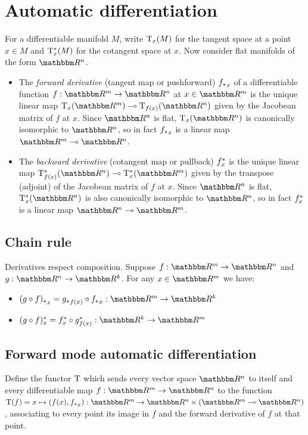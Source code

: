 \section{Automatic differentiation}
\label{sec:auto-diff}

For a differentiable manifold $M$, write $\mathrm{T}_x(M)$ for the tangent space at a point $x \in M$ and
$\mathrm{T}^*_x(M)$ for the cotangent space at $x$. Now consider flat manifolds of the form $\RR^n$.

\begin{itemize}
\item The \emph{forward derivative} (tangent map or pushforward) ${f_{*}}_x$ of a differentiable function
$f: \RR^m \to \RR^n$ at $x \in \RR^m$ is the unique linear map $\tangents_x(\RR^m) \linearto
\tangents_{f(x)}(\RR^n)$ given by the Jacobean matrix of $f$ at $x$. Since $\RR^n$ is flat,
$\tangents_x(\RR^n)$ is canonically isomorphic to $\RR^n$, so in fact ${f_{*}}_x$ is a linear map $\RR^m
\linearto \RR^n$.
\item The \emph{backward derivative} (cotangent map or pullback) $f^{*}_x$ is the unique linear map
$\cotangents_{f(x)}(\RR^n) \linearto \cotangents_x(\RR^m)$ given by the transpose (adjoint) of the Jacobean
matrix of $f$ at $x$. Since $\RR^n$ is flat, $\cotangents_x(\RR^n)$ is also canonically isomorphic to $\RR^n$,
so in fact $f^{*}_x$ is a linear map $\RR^n \linearto \RR^m$.
\end{itemize}

\subsection{Chain rule}

Derivatives respect composition. Suppose $f: \RR^m \to \RR^n$ and $g: \RR^n \to \RR^k$. For any $x \in \RR^m$
we have:

\begin{itemize}
\item $\pushf{(g \comp f)}_x = \pushf{g}_{f(x)} \comp \pushf{f}_x: \RR^m \to \RR^k$
\item $\pullf{(g \comp f)}_x = \pullf{f}_{x} \comp \pullf{g}_{f(x)}: \RR^k \to \RR^m$
\end{itemize}

\subsection{Forward mode automatic differentiation}

\begin{definition}
Define the functor $\mathrm{T}$ which sends every vector space $\RR^n$ to itself and every differentiable map
$f: \RR^m \to \RR^n$ to the function $\tangents(f) = x \mapsto (f(x), \pushf{f}_x): \RR^m \to \RR^n \times
(\RR^m \linearto \RR^n)$, associating to every point its image in $f$ and the forward derivative of $f$ at
that point.
\end{definition}


